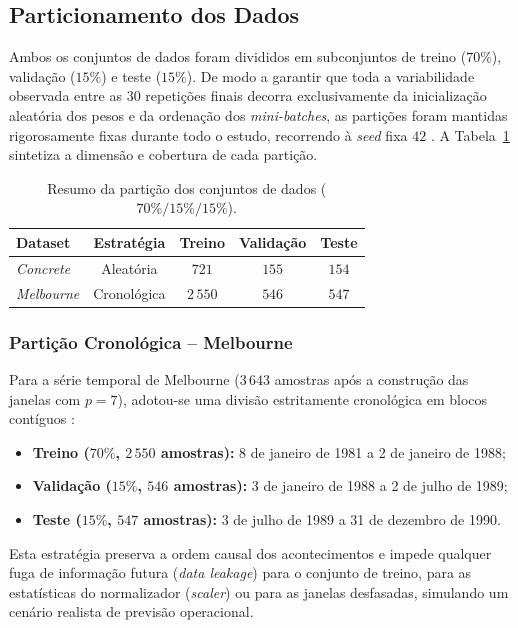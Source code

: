 \documentclass[conference]{IEEEtran}
\begin{document}
\subsection{Particionamento dos Dados}

Ambos os conjuntos de dados foram divididos em subconjuntos de treino ($70\%$), validação ($15\%$) e teste ($15\%$). De modo a garantir que toda a variabilidade observada entre as $30$ repetições finais decorra exclusivamente da inicialização aleatória dos pesos e da ordenação dos \textit{mini-batches}, as partições foram mantidas rigorosamente fixas durante todo o estudo, recorrendo à \textit{seed} fixa $42$ \cite{b1}. A Tabela~\ref{tab:splits} sintetiza a dimensão e cobertura de cada partição.

\begin{table}[htbp]
\caption{Resumo da partição dos conjuntos de dados ($70\% / 15\% / 15\%$).}
\label{tab:splits}
\centering
\scriptsize
\begin{tabular}{@{}lcccc@{}}
\toprule
\textbf{Dataset} & \textbf{Estratégia} & \textbf{Treino} & \textbf{Validação} & \textbf{Teste} \\
\midrule
\textit{Concrete} & Aleatória & $721$ & $155$ & $154$ \\
\textit{Melbourne} & Cronológica & $2\,550$ & $546$ & $547$ \\
\bottomrule
\end{tabular}
\end{table}

\subsubsection{Partição Cronológica -- Melbourne}
Para a série temporal de Melbourne ($3\,643$ amostras após a construção das janelas com $p=7$), adotou-se uma divisão estritamente cronológica em blocos contíguos \cite{b10}:
\begin{itemize}
    \item \textbf{Treino ($70\%$, $2\,550$ amostras):} 8 de janeiro de 1981 a 2 de janeiro de 1988;
    \item \textbf{Validação ($15\%$, $546$ amostras):} 3 de janeiro de 1988 a 2 de julho de 1989;
    \item \textbf{Teste ($15\%$, $547$ amostras):} 3 de julho de 1989 a 31 de dezembro de 1990.
\end{itemize}
Esta estratégia preserva a ordem causal dos acontecimentos e impede qualquer fuga de informação futura (\textit{data leakage}) para o conjunto de treino, para as estatísticas do normalizador (\textit{scaler}) ou para as janelas desfasadas, simulando um cenário realista de previsão operacional.
\end{document}
